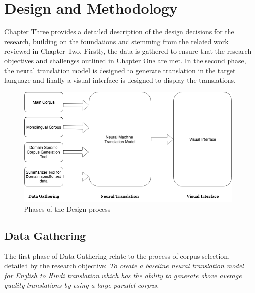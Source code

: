 \chapter{Design and Methodology}
Chapter Three provides a detailed description of the design decisions for the research, building on the foundations and stemming from the related work reviewed in Chapter Two. Firstly, the data is gathered to ensure that the research objectives and challenges outlined in Chapter One are met. In the second phase, the neural translation model is designed to generate translation in the target language and finally a visual interface is designed to display the translations.

\begin{figure}[h]
\includegraphics[width=\textwidth]{figures/maindesign.png}
\caption{Phases of the Design process} \label{maindesign}
\end{figure}

\section{Data Gathering}
The first phase of Data Gathering relate to the process of corpus selection, detailed by the research objective: \textit{To create a baseline neural translation model for English to Hindi translation which has the ability to generate above average quality translations by using a large parallel corpus.}
